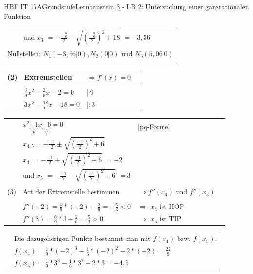 \documentclass[oneside,openany,headings=optiontotoc,11pt,numbers=noenddot]{scrreprt}
\begin{document}
\begin{worksheet}{HBF IT 17A}{Grundstufe}{Lernbaustein 3 - LB 2: Untersuchung einer ganzrationalen Funktion}
\begin{framed}
\begin{tabularx}{\textwidth}{lXXl}
				& & \multicolumn{2}{l}{und \colorbox{green!10}{\(x_3\)} \(= -\frac{-\frac{9}{6}}{2} - \sqrt{\left(\frac{-\frac{9}{6}}{2}\right)^2 +18}\) \colorbox{green!10}{\(=-3,56\)}}\\
				\multicolumn{4}{l}{Nullstellen: \colorbox{blue!5}{\(N_1(-3,56|0), N_2(0|0)\)} und \colorbox{blue!5}{\(N_3(5,06|0)\)}}\\
				\hline\hline\\
			\end{tabularx}
			\begin{tabularx}{\textwidth}{lXXl}
				(2) & Extremstellen & \(\Rightarrow f'(x) = 0\)\\
				\hline\\
				& \(\frac{3}{9}x^2 -\frac{2}{6}x -2 = 0\) & |\(\cdot 9\)\\
				& \(3x^2 -\frac{18}{6}x -18 = 0\) & |\(:3\)\\
			\end{tabularx}
			\begin{tabularx}{\textwidth}{lXXl}
				& \(x^2 \underbrace{-1}_{p}x \underbrace{-6}_{q} = 0\) & |pq-Formel\\
				& \(x_{4,5} = -\frac{-1}{2} \pm \sqrt{\left(\frac{-1}{2}\right)^2 + 6}\)\\
				& \multicolumn{2}{l}{\colorbox{green!10}{\(x_4\)} \(= -\frac{-1}{2} + \sqrt{\left(\frac{-1}{2}\right)^2 + 6}\) \colorbox{green!10}{\(= -2\)}}\\
				& \multicolumn{2}{l}{und \colorbox{green!10}{\(x_5\)} \(= -\frac{-1}{2} - \sqrt{\left(\frac{-1}{2}\right)^2 + 6}\) \colorbox{green!10}{\(= 3\)}}\\
				\\
				(3) & Art der Extremstelle bestimmen & \(\Rightarrow f''(x_4)\) und \(f''(x_5)\)\\
				\hline\\				 
				& \(f''(-2) = \frac{6}{9}*(-2) - \frac{2}{6} = -\frac{5}{3}< 0\) & \(\Rightarrow\) \colorbox{green!10}{\(x_4\) ist HOP}\\
				& \(f''(3) = \frac{6}{9}*3 - \frac{2}{6} = \frac{5}{3} > 0\) & \(\Rightarrow\) \colorbox{green!10}{\(x_5\) ist TIP}\\
			\end{tabularx}
			\begin{tabularx}{\textwidth}{ll}
				& Die dazugehörigen Punkte bestimmt man mit \(f(x_4)\) bzw. \(f(x_5)\).\\
				& \(f(x_4) = \frac{1}{9}*(-2)^3 -\frac{1}{6}*(-2)^2 -2*(-2) = \frac{22}{9}\)\\
				& \(f(x_5) = \frac{1}{9}*3^3 -\frac{1}{6}*3^2 -2*3 = -4,5\)\\

\end{tabularx}
\end{framed}
\end{worksheet}
\end{document}

